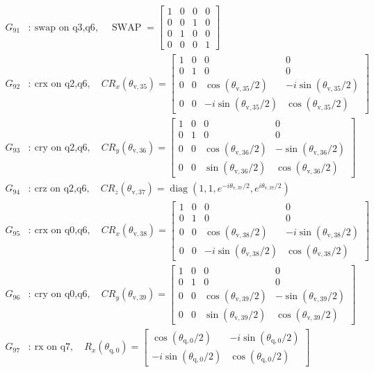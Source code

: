 \begin{align*}
G_{91}&:\ \text{swap on q3,q6},\quad \operatorname{SWAP}=\begin{bmatrix}1&0&0&0\\0&0&1&0\\0&1&0&0\\0&0&0&1\end{bmatrix}\\
G_{92}&:\ \text{crx on q2,q6},\quad CR_x(\theta_{\mathrm{v},35})=\begin{bmatrix}1&0&0&0\\0&1&0&0\\0&0&\cos(\theta_{\mathrm{v},35}/2)&-i\sin(\theta_{\mathrm{v},35}/2)\\0&0&-i\sin(\theta_{\mathrm{v},35}/2)&\cos(\theta_{\mathrm{v},35}/2)\end{bmatrix}\\
G_{93}&:\ \text{cry on q2,q6},\quad CR_y(\theta_{\mathrm{v},36})=\begin{bmatrix}1&0&0&0\\0&1&0&0\\0&0&\cos(\theta_{\mathrm{v},36}/2)&-\sin(\theta_{\mathrm{v},36}/2)\\0&0&\sin(\theta_{\mathrm{v},36}/2)&\cos(\theta_{\mathrm{v},36}/2)\end{bmatrix}\\
G_{94}&:\ \text{crz on q2,q6},\quad CR_z(\theta_{\mathrm{v},37})=\operatorname{diag}(1,1,e^{-i\theta_{\mathrm{v},37}/2},e^{i\theta_{\mathrm{v},37}/2})\\
G_{95}&:\ \text{crx on q0,q6},\quad CR_x(\theta_{\mathrm{v},38})=\begin{bmatrix}1&0&0&0\\0&1&0&0\\0&0&\cos(\theta_{\mathrm{v},38}/2)&-i\sin(\theta_{\mathrm{v},38}/2)\\0&0&-i\sin(\theta_{\mathrm{v},38}/2)&\cos(\theta_{\mathrm{v},38}/2)\end{bmatrix}\\
G_{96}&:\ \text{cry on q0,q6},\quad CR_y(\theta_{\mathrm{v},39})=\begin{bmatrix}1&0&0&0\\0&1&0&0\\0&0&\cos(\theta_{\mathrm{v},39}/2)&-\sin(\theta_{\mathrm{v},39}/2)\\0&0&\sin(\theta_{\mathrm{v},39}/2)&\cos(\theta_{\mathrm{v},39}/2)\end{bmatrix}\\
G_{97}&:\ \text{rx on q7},\quad R_x(\theta_{\mathrm{q},0})=\begin{bmatrix}\cos(\theta_{\mathrm{q},0}/2)&-i\sin(\theta_{\mathrm{q},0}/2)\\-i\sin(\theta_{\mathrm{q},0}/2)&\cos(\theta_{\mathrm{q},0}/2)\end{bmatrix}\\

\end{align*}
